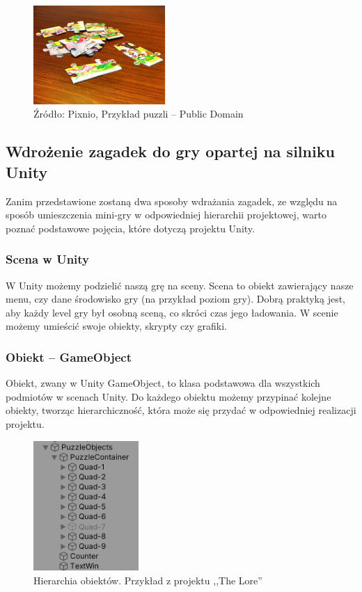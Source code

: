 \documentclass[oneside,polski,logo]{amuthesis}
\begin{document}
\begin{figure}[h]
	\centering
	\includegraphics[width=5cm]{images/tyrek/puzzle.jpg}
	\caption{Źródło: Pixnio, Przykład puzzli – Public Domain}
\end{figure}

\subsection{Wdrożenie zagadek do gry opartej na silniku Unity}
\par Zanim przedstawione zostaną dwa sposoby wdrażania zagadek, ze względu na sposób umieszczenia mini-gry w odpowiedniej hierarchii projektowej, warto poznać podstawowe pojęcia, które dotyczą projektu Unity.
\subsubsection{Scena w Unity}
\par W Unity możemy podzielić naszą grę na sceny. Scena to obiekt zawierający nasze menu, czy dane środowisko gry (na przykład poziom gry). Dobrą praktyką jest, aby każdy level gry był osobną sceną, co skróci czas jego ładowania. W scenie możemy umieścić swoje obiekty, skrypty czy grafiki. \cite{scena}
\subsubsection{Obiekt – GameObject}
\label{sec:gameobject}
\par Obiekt, zwany w Unity GameObject, to klasa podstawowa dla wszystkich podmiotów w scenach Unity. Do każdego obiektu możemy przypinać kolejne obiekty, tworząc hierarchiczność, która może się przydać w odpowiedniej realizacji projektu. \cite{gameobject}
\begin{figure}[h]
	\centering
	\includegraphics[width=4cm]{images/tyrek/hierarchia.png}
	\caption{Hierarchia obiektów. Przykład z projektu ,,The Lore''}
\end{figure}
\end{document}

